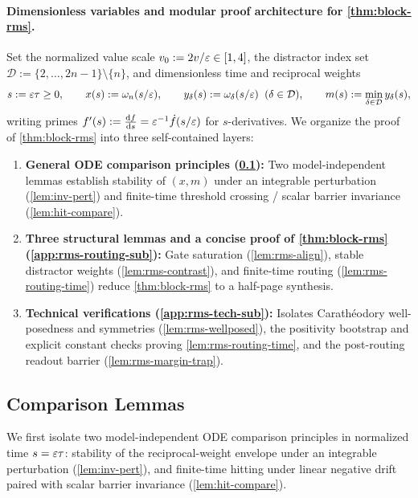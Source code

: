 \paragraph{Dimensionless variables and modular proof architecture for \cref{thm:block-rms}.}
Set the normalized value scale $v_0 := 2v/\varepsilon \in [1, 4]$, the distractor index set $\mathcal D := \{2,\ldots,2n-1\}\setminus\{n\}$, and dimensionless time and reciprocal weights
\[
  s := \varepsilon\tau \ge 0, \qquad
  x(s) := \omega_n(s/\varepsilon), \qquad
  y_\delta(s) := \omega_\delta(s/\varepsilon) \;\; (\delta \in \mathcal D), \qquad
  m(s) := \min_{\delta\in\mathcal D} y_\delta(s),
\]
writing primes $f'(s) := \frac{\mathrm{d} f}{\mathrm{d} s} = \varepsilon^{-1}\dot f(s/\varepsilon)$ for $s$-derivatives. We organize the proof of \cref{thm:block-rms} into three self-contained layers:
\begin{enumerate}[leftmargin=*,itemsep=1.5pt,topsep=2pt]
\item \textbf{General ODE comparison principles (\cref{app:rms-compare-sub}):} Two model-independent lemmas establish stability of $(x, m)$ under an integrable perturbation (\cref{lem:inv-pert}) and finite-time threshold crossing / scalar barrier invariance (\cref{lem:hit-compare}).
\item \textbf{Three structural lemmas and a concise proof of \cref{thm:block-rms} (\cref{app:rms-routing-sub}):} Gate saturation (\cref{lem:rms-align}), stable distractor weights (\cref{lem:rms-contrast}), and finite-time routing (\cref{lem:rms-routing-time}) reduce \cref{thm:block-rms} to a half-page synthesis.
\item \textbf{Technical verifications (\cref{app:rms-tech-sub}):} Isolates Carath\'eodory well-posedness and symmetries (\cref{lem:rms-wellposed}), the positivity bootstrap and explicit constant checks proving \cref{lem:rms-routing-time}, and the post-routing readout barrier (\cref{lem:rms-margin-trap}).
\end{enumerate}

\subsection{Comparison Lemmas}
\label{app:rms-compare-sub}

We first isolate two model-independent ODE comparison principles in normalized time $s = \varepsilon\tau$: stability of the reciprocal-weight envelope under an integrable perturbation (\cref{lem:inv-pert}), and finite-time hitting under linear negative drift paired with scalar barrier invariance (\cref{lem:hit-compare}).

